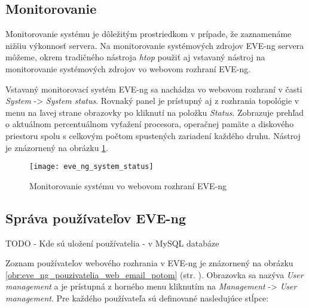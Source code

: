 \subsection{Monitorovanie}

Monitorovanie systému je dôležitým prostriedkom v prípade, že zaznamenáme nižšiu výkonnosť servera. Na monitorovanie systémových zdrojov EVE-ng servera môžeme, okrem tradičného nástroja \emph{htop} použiť aj vstavaný nástroj na monitorovanie systémových zdrojov vo webovom rozhraní EVE-ng.

Vstavaný monitorovací systém EVE-ng sa nachádza vo webovom rozhraní v časti \emph{System} -> \emph{System status}. Rovnaký panel je prístupný aj z rozhrania topológie v menu na ľavej strane obrazovky po kliknutí na položku \emph{Status}. Zobrazuje prehľad o aktuálnom percentuálnom vyťažení procesora, operačnej pamäte a diskového priestoru spolu s celkovým počtom spustených zariadení každého druhu. Nástroj je znázornený na obrázku \ref{obr:eve_ng_system_status}.

\begin{figure}
    \centering
    \texttt{[image: eve\_ng\_system\_status]}
    \caption{Monitorovanie systému vo webovom rozhraní EVE-ng}
    \label{obr:eve_ng_system_status}
\end{figure}




\subsection{Správa používateľov EVE-ng}

{\huge TODO - Kde sú uložení používatelia - v MySQL databáze}

Zoznam používateľov webového rozhrania v EVE-ng je znázornený na obrázku \ref{obr:eve_ng_pouzivatelia_web_email_potom} (str. \pageref{obr:eve_ng_pouzivatelia_web_email_potom}). Obrazovka sa nazýva \emph{User management} a je prístupná z horného menu kliknutím na \emph{Management} -> \emph{User management}. Pre každého používateľa sú definované nasledujúce stĺpce:

